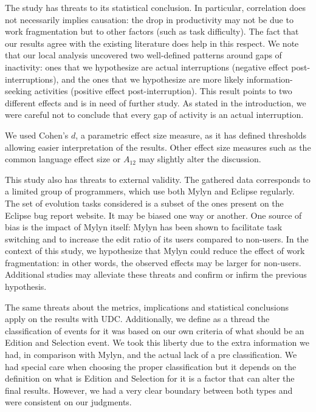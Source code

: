 \documentclass[times]{smrauth}
\begin{document}
The study has threats to its statistical conclusion. In particular, correlation does not necessarily implies causation: the drop in productivity may not be due to work fragmentation but to other factors (such as task difficulty). The fact that our results agree with the existing literature does help in this respect. We note that our local analysis uncovered two well-defined patterns around gaps of inactivity: ones that we hypothesize are actual interruptions (negative effect post-interruptions), and the ones that we hypothesize are more likely information-seeking activities (positive effect post-interruption). This result points to two different effects and is in need of further study. As stated in the introduction, we were careful not to conclude that every gap of activity is an actual interruption.

We used Cohen's $d$, a parametric effect size measure, as it has defined thresholds allowing easier interpretation of the results. Other effect size measures such as the common language effect size \cite{KMW92} or $A_{12}$ \cite{RRT12} may slightly alter the discussion.

This study also has threats to external validity. The gathered data corresponds to a limited group of programmers, which use both Mylyn and Eclipse regularly. The set of evolution tasks considered is a subset of the ones present on the Eclipse bug report website. It may be biased one way or another. One source of bias is the impact of Mylyn itself: Mylyn has been shown to facilitate task switching and to increase the edit ratio of its users compared to non-users. In the context of this study, we hypothesize that Mylyn could reduce the effect of work fragmentation: in other words, the observed effects may be larger for non-users. Additional studies may alleviate these threats and confirm or infirm the previous hypothesis.


The same threats about the metrics, implications and statistical conclusions apply on the results with UDC. Additionally, we define as a thread the classification of events for it was based on our own criteria of what should be an Edition and Selection event. We took this liberty due to the extra information we had, in comparison with Mylyn, and the actual lack of a pre classification. We had special care when choosing the proper classification but it depends on the definition on what is Edition and Selection for it is a factor that can alter the final results. However, we had a very clear boundary between both types and were consistent on our judgments. 
\end{document}

